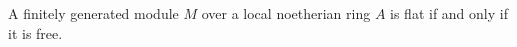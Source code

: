 A finitely generated module $M$ over a local noetherian ring $A$ is flat if and only if it is free.
